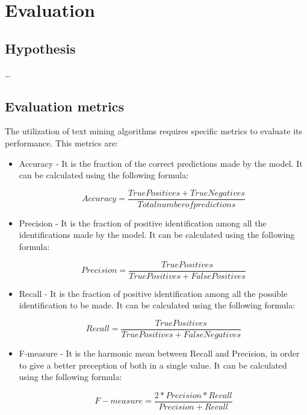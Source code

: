 
\chapter{Evaluation} %
\label{chap:Chapter6} 

\section{Hypothesis}

\dots

\section{Evaluation metrics}

The utilization of text mining algorithms requires specific metrics to evaluate its performance.
This metrics are: 

\begin{itemize}
    \item Accuracy - It is the fraction of the correct predictions made by the model.
    It can be calculated using the following formula:

    \begin{equation}
    Accuracy = \frac{True Positives + True Negatives}{Total number of predictions}
    \label{eqn:Accuracy}
    \end{equation}

    \item Precision - It is the fraction of positive identification among all the identifications made by the model.
    It can be calculated using the following formula:
    
    \begin{equation}
    Precision = \frac{True Positives}{True Positives + False Positives}
    \label{eqn:Precision}
    \end{equation}

    \item Recall - It is the fraction of positive identification among all the possible identification to be made.
    It can be calculated using the following formula:
    
    \begin{equation}
    Recall = \frac{True Positives}{True Positives + False Negatives}
    \label{eqn:Recall}
    \end{equation}

    \item F-measure - It is the harmonic mean between Recall and Precision, in order to give a better preception of both in a single value.
    It can be calculated using the following formula:
    
    \begin{equation}
    F-measure = \frac{2*{Precision}*{Recall}}{Precision + Recall}
    \label{eqn:F-measure}
    \end{equation}

\end{itemize}

